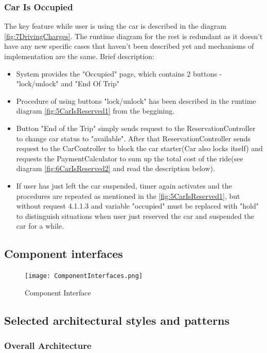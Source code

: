 \documentclass[12pt, letterpaper]{article}
\begin{document}
\subsubsection{Car Is Occupied}
The key feature while user is using the car is described in the diagram \ref{fig:7DrivingCharges}. The runtime diagram for the rest is redundant as it doesn't have any new specific cases that haven't been described yet and mechanisms of implementation are the same. Brief description:
\begin{itemize}
	\item System provides the "Occupied" page, which contains 2 buttons - "lock/unlock" and "End Of Trip"
	\item Procedure of using buttons "lock/unlock" has been described in the runtime diagram \ref{fig:5CarIsReserved1} from the beggining.
	\item Button "End of the Trip" simply sends request to the ReservationController to change car status to "available". After that ReservationController sends request to the CarController to block the car starter(Car also locks itself) and requests the PaymentCalculator to sum up the total cost of the ride(see diagram \ref{fig:6CarIsReserved2} and read the description below).
	\item If user has just left the car suspended, timer again activates and the procedures are repeated as mentioned in the \ref{fig:5CarIsReserved1}, but without request 4.1.1.3 and variable "occupied" must be replaced with "hold" to distinguish situations when user just reserved the car and suspended the car for a while.
\end{itemize}  
\newpage

\subsection{Component interfaces}
\begin{figure}[H]
\centering
\texttt{[image: ComponentInterfaces.png]} 
\caption{Component Interface}
\label{fig:CompInter}
\end{figure}

\subsection{Selected architectural styles and patterns}
\subsubsection{Overall Architecture}
\end{document}

